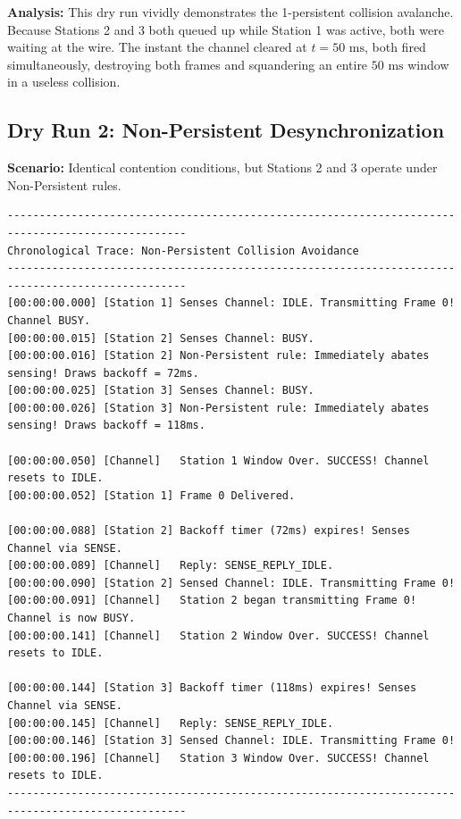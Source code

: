 \documentclass[12pt, a4paper]{article}
\begin{document}
\textbf{Analysis:} This dry run vividly demonstrates the 1-persistent collision avalanche. Because Stations 2 and 3 both queued up while Station 1 was active, both were waiting at the wire. The instant the channel cleared at $t = 50\text{ ms}$, both fired simultaneously, destroying both frames and squandering an entire $50\text{ ms}$ window in a useless collision.

\subsection{Dry Run 2: Non-Persistent Desynchronization}
\textbf{Scenario:} Identical contention conditions, but Stations 2 and 3 operate under Non-Persistent rules.

\begin{scriptsize}
\begin{verbatim}
--------------------------------------------------------------------------------------------------
Chronological Trace: Non-Persistent Collision Avoidance
--------------------------------------------------------------------------------------------------
[00:00:00.000] [Station 1] Senses Channel: IDLE. Transmitting Frame 0! Channel BUSY.
[00:00:00.015] [Station 2] Senses Channel: BUSY.
[00:00:00.016] [Station 2] Non-Persistent rule: Immediately abates sensing! Draws backoff = 72ms.
[00:00:00.025] [Station 3] Senses Channel: BUSY.
[00:00:00.026] [Station 3] Non-Persistent rule: Immediately abates sensing! Draws backoff = 118ms.

[00:00:00.050] [Channel]   Station 1 Window Over. SUCCESS! Channel resets to IDLE.
[00:00:00.052] [Station 1] Frame 0 Delivered.

[00:00:00.088] [Station 2] Backoff timer (72ms) expires! Senses Channel via SENSE.
[00:00:00.089] [Channel]   Reply: SENSE_REPLY_IDLE.
[00:00:00.090] [Station 2] Sensed Channel: IDLE. Transmitting Frame 0!
[00:00:00.091] [Channel]   Station 2 began transmitting Frame 0! Channel is now BUSY.
[00:00:00.141] [Channel]   Station 2 Window Over. SUCCESS! Channel resets to IDLE.

[00:00:00.144] [Station 3] Backoff timer (118ms) expires! Senses Channel via SENSE.
[00:00:00.145] [Channel]   Reply: SENSE_REPLY_IDLE.
[00:00:00.146] [Station 3] Sensed Channel: IDLE. Transmitting Frame 0!
[00:00:00.196] [Channel]   Station 3 Window Over. SUCCESS! Channel resets to IDLE.
--------------------------------------------------------------------------------------------------
\end{verbatim}
\end{scriptsize}
\end{document}
